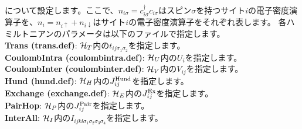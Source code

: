 \begin{description}
\begin{eqnarray}
\end{eqnarray}
について設定します。ここで、$n_{i \sigma}=c_{i\sigma}^{\dag}c_{i\sigma}$はスピン$\sigma$を持つサイト$i$の電子密度演算子を、$n_i=n_{i\uparrow}+n_{i\downarrow}$はサイト$i$の電子密度演算子をそれぞれ表します。 各ハミルトニアンのパラメータは以下のファイルで指定します。
~\\{\bf Trans (trans.def)}: 
${\cal H}_T$内の$t_{ij\sigma_1\sigma_2}$を指定します。
~\\{\bf CoulombIntra (coulombintra.def)}: 
${\cal H}_U$内の$U_i$を指定します。
~\\{\bf CoulombInter (coulombinter.def)}: 
${\cal H}_V$内の$V_{ij}$を指定します。
~\\{\bf Hund (hund.def)}: 
${\cal H}_H$内の$J_{ij}^{\rm Hund}$を指定します。
~\\{\bf Exchange (exchange.def)}:
${\cal H}_E$内の$J_{ij}^{\rm Ex}$を指定します。
~\\{\bf PairHop}:  ${\cal H}_P$内の$J_{ij}^{\rm Pair}$を指定します。
~\\{\bf InterAll}: ${\cal H}_I$内の$I_{ijkl\sigma_1\sigma_2\sigma_3\sigma_4}$を指定します。


\end{description}
